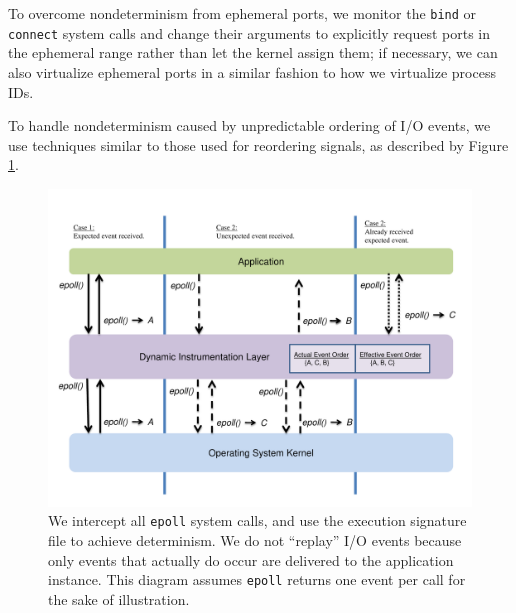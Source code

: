 \newpage 
To overcome nondeterminism from ephemeral ports, 
we monitor the \texttt{bind} or \texttt{connect} 
system calls and change their arguments to explicitly request ports
in the ephemeral range rather than let the kernel 
assign them; if necessary,
we can also virtualize ephemeral ports
in a similar fashion to how we virtualize process IDs. \newline


 \newline
To handle nondeterminism caused by unpredictable
ordering of I/O events,
we use techniques similar to those used 
for reordering signals,
as described by Figure \ref{ch3:reorderfig}.

\begin{figure}[h]
  \center
  \includegraphics[trim=0cm 1.25cm 0cm 0.75cm, scale=0.60]{epoll.pdf}
  \caption[Reordering I/O events using Pin]%
    {We intercept all \texttt{epoll} system calls,
    and use the execution signature file to
    achieve determinism. We do not ``replay'' I/O
    events because only events that actually do occur
    are delivered to the application instance. This
    diagram assumes \texttt{epoll} returns one event
    per call for the sake of illustration. }       
  \label{ch3:reorderfig}
\end{figure} 
              
